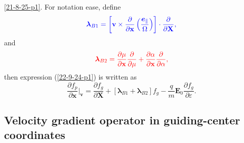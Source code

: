 \documentclass{article}
\newcommand{\nobracket}{}
\newcommand{\tmcolor}[2]{{\color{#1}{#2}}}
\newcommand{\tmmathbf}[1]{\ensuremath{\boldsymbol{#1}}}
\begin{document}
\ref{21-8-25-p1}. For notation ease, define
\begin{equation}
  \label{18-9-16-1} \tmcolor{blue}{\tmmathbf{\lambda}_{B 1} = \left[
  \mathbf{v} \times \frac{\partial}{\partial \mathbf{x}} \left(
  \frac{\tmmathbf{e}_{\parallel}}{\Omega} \right) \right] \cdot
  \frac{\partial}{\partial \mathbf{X}},}
\end{equation}
and
\begin{equation}
  \label{18-9-16-2} \tmcolor{red}{\tmmathbf{\lambda}_{B 2} = \frac{\partial
  \mu}{\partial \mathbf{x}}  \frac{\partial}{\partial \mu} + \frac{\partial
  \alpha}{\partial \mathbf{x}}  \frac{\partial}{\partial \alpha},}
\end{equation}
then expression (\ref{22-9-24-p1}) is written as
\begin{equation}
  \label{17-9-2-p1} \frac{\partial f_p}{\partial \mathbf{x}} |_{\mathbf{v}}
  \nobracket = \frac{\partial f_g}{\partial \mathbf{X}} +
  [\tmmathbf{\lambda}_{B 1} +\tmmathbf{\lambda}_{B 2}] f_g - \frac{q}{m}
  \mathbf{E}_0 \frac{\partial f_g}{\partial \varepsilon} .
\end{equation}


\subsection{Velocity gradient operator in guiding-center coordinates}
\end{document}
